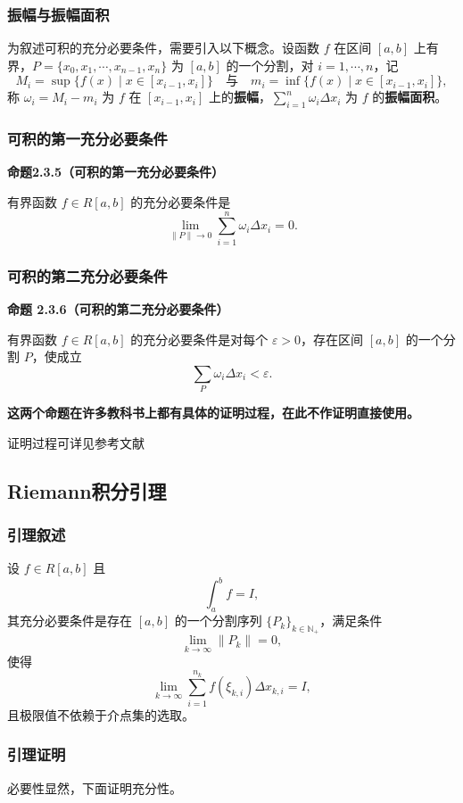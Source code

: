 \documentclass[12pt]{ctexart}
\begin{document}
\subsubsection*{振幅与振幅面积}
为叙述可积的充分必要条件，需要引入以下概念。设函数 $f$ 在区间 $[a, b]$ 上有界，$P = \{x_0, x_1, \cdots, x_{n-1}, x_n\}$ 为 $[a, b]$ 的一个分割，对 $i = 1, \cdots, n$，记
\[
M_i = \sup\{f(x) \mid x \in [x_{i-1}, x_i]\} \quad \text{与} \quad m_i = \inf\{f(x) \mid x \in [x_{i-1}, x_i]\},
\]
称 $\omega_i = M_i - m_i$ 为 $f$ 在 $[x_{i-1}, x_i]$ 上的\textbf{振幅}，$\sum_{i=1}^n \omega_i \Delta x_i$ 为 $f$ 的\textbf{振幅面积}。
\subsubsection*{可积的第一充分必要条件}
\textbf{命题2.3.5（可积的第一充分必要条件）}  

有界函数 $f \in R[a, b]$ 的充分必要条件是
\[
\lim_{\|P\| \to 0} \sum_{i=1}^n \omega_i \Delta x_i = 0.
\]
\subsubsection*{可积的第二充分必要条件}

\textbf{命题 2.3.6（可积的第二充分必要条件）}  

有界函数 $f \in R[a, b]$ 的充分必要条件是对每个 $\varepsilon > 0$，存在区间 $[a, b]$ 的一个分割 $P$，使成立
\[
\sum_P \omega_i \Delta x_i < \varepsilon.
\]

\textbf{这两个命题在许多教科书上都有具体的证明过程，在此不作证明直接使用。} 

证明过程可详见参考文献\cite{key3}\cite{key4}

\subsection{Riemann积分引理}

\subsubsection*{引理叙述}
设 $f \in R[a, b]$ 且
\[
\int_a^b f = I,
\]
其充分必要条件是存在 $[a, b]$ 的一个分割序列 $\{P_k\}_{k \in \mathbb{N}_+}$，满足条件
\[
\lim_{k \to \infty} \|P_k\| = 0,
\]
使得
\[
\lim_{k \to \infty} \sum_{i=1}^{n_k} f(\xi_{k, i}) \Delta x_{k, i} = I,
\]
且极限值不依赖于介点集的选取。

\subsubsection*{引理证明}
必要性显然，下面证明充分性。
\end{document}
